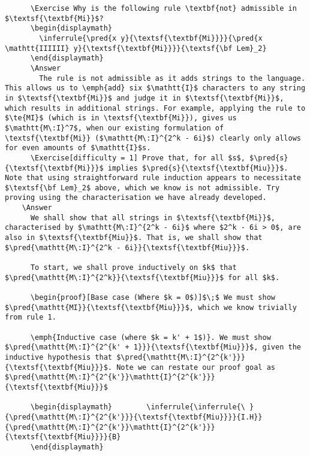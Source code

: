\documentclass{book}
\begin{document}
\begin{verbatim}
      \Exercise Why is the following rule \textbf{not} admissible in $\textsf{\textbf{Mi}}$?
      \begin{displaymath}
        \inferrule{\pred{x y}{\textsf{\textbf{Mi}}}}{\pred{x \mathtt{IIIIII} y}{\textsf{\textbf{Mi}}}}{\textsf{\bf Lem}_2}
      \end{displaymath}
      \Answer
        The rule is not admissible as it adds strings to the language. This allows us to \emph{add} six $\mathtt{I}$ characters to any string in $\textsf{\textbf{Mi}}$ and judge it in $\textsf{\textbf{Mi}}$, which results in additional strings. For example, applying the rule to $\te{MI}$ (which is in \textsf{\textbf{Mi}}), gives us $\mathtt{M\:I}^7$, when our existing formulation of \textsf{\textbf{Mi}} ($\mathtt{M\:I}^{2^k - 6i}$) clearly only allows for even amounts of $\mathtt{I}$s.
      \Exercise[difficulty = 1] Prove that, for all $s$, $\pred{s}{\textsf{\textbf{Mi}}}$ implies $\pred{s}{\textsf{\textbf{Miu}}}$. Note that using straightforward rule induction appears to necessitate $\textsf{\bf Lem}_2$ above, which we know is not admissible. Try proving using the characterisation we have already developed.
    \Answer
      We shall show that all strings in $\textsf{\textbf{Mi}}$, characterised by $\mathtt{M\:I}^{2^k - 6i}$ where $2^k - 6i > 0$, are also in $\textsf{\textbf{Miu}}$. That is, we shall show that $\pred{\mathtt{M\:I}^{2^k - 6i}}{\textsf{\textbf{Miu}}}$.
      
      To start, we shall prove inductively on $k$ that $\pred{\mathtt{M\:I}^{2^k}}{\textsf{\textbf{Miu}}}$ for all $k$.
      
      \begin{proof}[Base case (Where $k = 0$)]$\;$ We must show $\pred{\mathtt{MI}}{\textsf{\textbf{Miu}}}$, which we know trivially from rule 1.
      
      \emph{Inductive case (where $k = k' + 1$)}. We must show $\pred{\mathtt{M\:I}^{2^{k' + 1}}}{\textsf{\textbf{Miu}}}$, given the inductive hypothesis that $\pred{\mathtt{M\:I}^{2^{k'}}}{\textsf{\textbf{Miu}}}$. Note we can restate our proof goal as $\pred{\mathtt{M\:I}^{2^{k'}}\mathtt{I}^{2^{k'}}}{\textsf{\textbf{Miu}}}$
      
      \begin{displaymath}        \inferrule{\inferrule{\ }{\pred{\mathtt{M\:I}^{2^{k'}}}{\textsf{\textbf{Miu}}}}{I.H}}{\pred{\mathtt{M\:I}^{2^{k'}}\mathtt{I}^{2^{k'}}}{\textsf{\textbf{Miu}}}}{B}
      \end{displaymath}
      

\end{verbatim}
\end{document}
